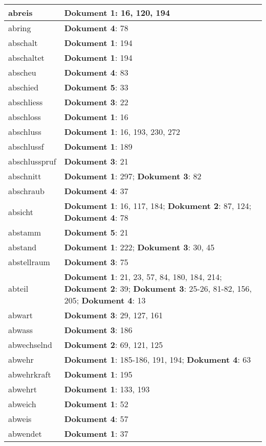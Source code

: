 \documentclass[a5paper]{article}
\begin{document}
\begin{longtable}[l]{|l|p{3in}|}
\hline
abreis & \textbf{Dokument 1}: 16, 120, 194 \\
\hline
abring & \textbf{Dokument 4}: 78 \\
\hline
abschalt & \textbf{Dokument 1}: 194 \\
\hline
abschaltet & \textbf{Dokument 1}: 194 \\
\hline
abscheu & \textbf{Dokument 4}: 83 \\
\hline
abschied & \textbf{Dokument 5}: 33 \\
\hline
abschliess & \textbf{Dokument 3}: 22 \\
\hline
abschloss & \textbf{Dokument 1}: 16 \\
\hline
abschluss & \textbf{Dokument 1}: 16, 193, 230, 272 \\
\hline
abschlussf & \textbf{Dokument 1}: 189 \\
\hline
abschlusspruf & \textbf{Dokument 3}: 21 \\
\hline
abschnitt & \textbf{Dokument 1}: 297; \textbf{Dokument 3}: 82 \\
\hline
abschraub & \textbf{Dokument 4}: 37 \\
\hline
absicht & \textbf{Dokument 1}: 16, 117, 184; \textbf{Dokument 2}: 87, 124; \textbf{Dokument 4}: 78 \\
\hline
abstamm & \textbf{Dokument 5}: 21 \\
\hline
abstand & \textbf{Dokument 1}: 222; \textbf{Dokument 3}: 30, 45 \\
\hline
abstellraum & \textbf{Dokument 3}: 75 \\
\hline
abteil & \textbf{Dokument 1}: 21, 23, 57, 84, 180, 184, 214; \textbf{Dokument 2}: 39; \textbf{Dokument 3}: 25-26, 81-82, 156, 205; \textbf{Dokument 4}: 13 \\
\hline
abwart & \textbf{Dokument 3}: 29, 127, 161 \\
\hline
abwass & \textbf{Dokument 3}: 186 \\
\hline
abwechselnd & \textbf{Dokument 2}: 69, 121, 125 \\
\hline
abwehr & \textbf{Dokument 1}: 185-186, 191, 194; \textbf{Dokument 4}: 63 \\
\hline
abwehrkraft & \textbf{Dokument 1}: 195 \\
\hline
abwehrt & \textbf{Dokument 1}: 133, 193 \\
\hline
abweich & \textbf{Dokument 1}: 52 \\
\hline
abweis & \textbf{Dokument 4}: 57 \\
\hline
abwendet & \textbf{Dokument 1}: 37 \\

\end{longtable}
\end{document}
